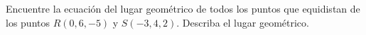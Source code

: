 \item Encuentre la ecuación del lugar geométrico de todos los puntos que equidistan de los puntos $R(0, 6, -5)$ y $S(-3, 4, 2)$. Describa el lugar geométrico.
